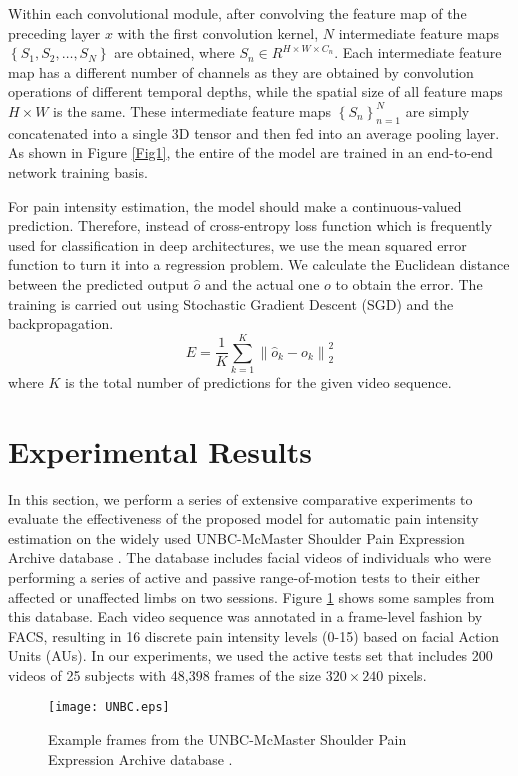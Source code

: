 \documentclass[a4paper,conference]{IEEEtran}
\begin{document}
Within each convolutional module, after convolving the feature map of the preceding layer $x$ with the first convolution kernel, $N$ intermediate feature maps $\left\{ {{S}_{1}},{{S}_{2}},\ldots ,{{S}_{N}} \right\}$ are obtained, where ${{S}_{n}}\in {{R}^{H\times W\times {{C}_{n}}}}$. Each intermediate feature map has a different number of channels as they are obtained by convolution operations of different temporal depths, while the spatial size of all feature maps $H\times W$ is the same. These intermediate feature maps $\left\{ {{S}_{n}} \right\}_{n=1}^{N}$ are simply concatenated into a single 3D tensor and then fed into an average pooling layer. As shown in Figure \ref{Fig1}, the entire of the model are trained in an end-to-end network training basis.

For pain intensity estimation, the model should make a continuous-valued prediction. Therefore, instead of cross-entropy loss function which is frequently used for classification in deep architectures, we use the mean squared error function to turn it into a regression problem. We calculate the Euclidean distance between the predicted output $\hat{o}$ and the actual one $o$ to obtain the error. The training is carried out using Stochastic Gradient Descent (SGD) and the backpropagation.
\begin{equation}
E=\frac{1}{K}\sum\limits_{k=1}^{K}{\left\| {{{\hat{o}}}_{k}}-{{o}_{k}} \right\|_{2}^{2}}
\end{equation}
where $K$ is the total number of predictions for the given video sequence.

\section{Experimental Results}
In this section, we perform a series of extensive comparative experiments to evaluate the effectiveness of the proposed model for automatic pain intensity estimation on the widely used UNBC-McMaster Shoulder Pain Expression Archive database \cite{c1}. The database includes facial videos of individuals who were performing a series of active and passive range-of-motion tests to their either affected or unaffected limbs on two sessions. Figure \ref{UNBC} shows some samples from this database. Each video sequence was annotated in a frame-level fashion by FACS, resulting in 16 discrete pain intensity levels (0-15) based on facial Action Units (AUs). In our experiments, we used the active tests set that includes 200 videos of 25 subjects with 48,398 frames of the size $320\times 240$ pixels.
\begin{figure}[t]
\begin{center}
	\texttt{[image: UNBC.eps]}
\end{center}
	\caption{Example frames from the UNBC-McMaster Shoulder Pain Expression Archive database \cite{c1}.}
    \label{UNBC}
\end{figure}
\end{document}
